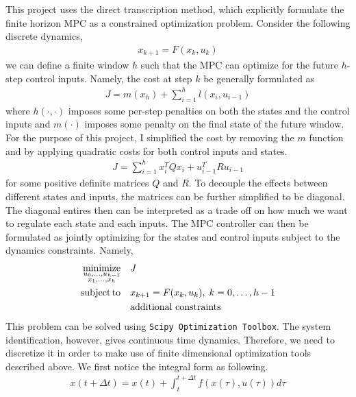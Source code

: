 \documentclass[10pt,twocolumn]{article}
\DeclareMathOperator*{\minimize}{minimize}
\DeclareMathOperator*{\subto}{subject\,to}
\begin{document}
This project uses the direct transcription method, which explicitly formulate the finite horizon
MPC as a constrained optimization problem. Consider the following discrete dynamics,
\begin{gather}
  x_{k+1} = F(x_k, u_k)
\end{gather}
we can define a finite window $h$ such that the MPC can optimize for the future $h$-step
control inputs. Namely, the cost at step $k$ be generally formulated as
\begin{gather}
  J = m(x_h) + \sum_{i=1}^h l(x_i, u_{i-1})
\end{gather}
where $h(\cdot, \cdot)$ imposes some per-step penalties on both the states and the control inputs
and $m(\cdot)$ imposes some penalty on the final state of the future window. For the purpose
of this project, I simplified the cost by removing the $m$ function and
by applying quadratic costs for both control inputs and states.
\begin{gather}
  J = \sum_{i=1}^h x_i^T Q x_i + u_{i-1}^T R u_{i-1}
\end{gather}
for some positive definite matrices $Q$ and $R$. To decouple the effects between different
states and inputs, the matrices can be further simplified to be diagonal. The diagonal entires
then can be interpreted as a trade off on how much we want to regulate each state and each
inputs. The MPC controller can then be formulated as jointly optimizing for the states and
control inputs subject to the dynamics constraints. Namely,
\begin{gather}
  \begin{aligned}
    \minimize_{\begin{subarray}{c}u_0,\ldots,u_{h-1} \\ x_1,\ldots,x_h\end{subarray}}\quad &J \\
      \subto\quad &x_{k+1} = F(x_k, u_k),\; k=0,\ldots,h-1 \\
      &\text{additional constraints}
  \end{aligned}
\end{gather}
This problem can be solved using \texttt{Scipy Optimization Toolbox}.
The system identification, however, gives continuous time dynamics. Therefore, we need to discretize
it in order to make use of finite dimensional optimization tools described above.
We first notice the integral form as following.
\begin{gather}
  x(t + \Delta t) = x(t) + \int_t^{t + \Delta t} f(x(\tau), u(\tau)) d\tau
\end{gather}
\end{document}
